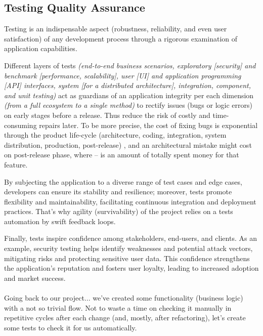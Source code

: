 
\subsection{Testing Quality Assurance}

Testing is an indispensable aspect (robustness, reliability, and even user satisfaction) of any development process 
through a rigorous examination of application capabilities.

Different layers of tests \emph{(end-to-end business scenarios, exploratory [security] and benchmark [performance, scalability], 
user [UI] and application programming [API] interfaces, system [for a distributed architecture], integration, component,
and unit testing)} act as guardians of an application integrity per each dimension \emph{(from a full ecosystem to a 
single method)} to rectify issues (bugs or logic errors) on early stages before a release. Thus reduce the risk of 
costly and time-consuming repairs later. To be more precise, the cost of fixing bugs is exponential through the
product life-cycle (architecture, coding, integration, system distribution, production, post-release) 
\cite{Sanket19} \cite{Boeh88}, and an architectural mistake might cost  on post-release phase, where 
 -- is an amount of totally spent money for that feature.

By subjecting the application to a diverse range of test cases and edge cases, developers can ensure its stability and 
resilience; moreover, tests promote flexibility and maintainability, facilitating continuous integration and deployment 
practices. That's why agility (survivability) of the project relies on a tests automation by swift feedback loops.

Finally, tests inspire confidence among stakeholders, end-users, and clients. As an example, security testing helps 
identify weaknesses and potential attack vectors, mitigating risks and protecting sensitive user data. This confidence 
strengthens the application's reputation and fosters user loyalty, leading to increased adoption and market success.\\
\\

\noindent Going back to our project... we've created some functionality (business logic) with a not so trivial flow. 
Not to waste a time on checking it manually in repetitive cycles after each change (and, mostly, after 
refactoring), let's create some tests to check it for us automatically.


